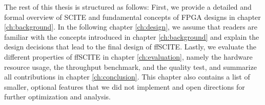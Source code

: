 The rest of this thesis is structured as follows: First, we provide a detailed and formal overview of \ac{SCITE} and fundamental concepts of \ac{FPGA} designs in chapter \ref{ch:background}. In the following chapter \ref{ch:design}, we assume that readers are familiar with the concepts introduced in chapter \ref{ch:background} and explain the design decisions that lead to the final design of \ac{ffSCITE}. Lastly, we evaluate the different properties of \ac{ffSCITE} in chapter \ref{ch:evaluation}, namely the hardware resource usage, the throughput benchmark, and the quality test, and summarize all contributions in chapter \ref{ch:conclusion}. This chapter also contains a list of smaller, optional features that we did not implement and open directions for further optimization and analysis.